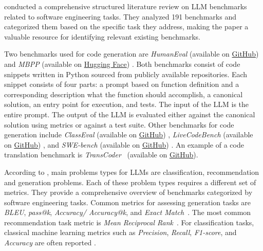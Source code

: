 \citeauthor{hu2025assessingadvancingbenchmarksevaluating} conducted a comprehensive structured literature review on LLM benchmarks related to software engineering tasks.
They analyzed 191 benchmarks and categorized them based on the specific task they address, making the paper a valuable resource for identifying relevant existing benchmarks.

Two benchmarks used for code generation are \emph{HumanEval} (available on \href{https://github.com/openai/human-eval}{GitHub}) \cite{DBLP:conf/acl/PapineniRWZ02} and \emph{MBPP} (available on \href{https://huggingface.co/datasets/google-research-datasets/mbpp}{Hugging Face}) \cite{DBLP:journals/corr/abs-2108-07732}.
Both benchmarks consist of code snippets written in Python sourced from publicly available repositories.
Each snippet consists of four parts: a prompt based on function definition and a corresponding description what the function should accomplish, a canonical solution, an entry point for execution, and tests.
The input of the LLM is the entire prompt.
The output of the LLM is evaluated either against the canonical solution using metrics or against a test suite.
Other benchmarks for code generation include \emph{ClassEval} (available on \href{https://github.com/FudanSELab/ClassEval}{GitHub}) \cite{DBLP:journals/corr/abs-2308-01861}, \emph{LiveCodeBench} (available on \href{https://github.com/LiveCodeBench/LiveCodeBench}{GitHub}) \cite{DBLP:journals/corr/abs-2403-07974}, and \emph{SWE-bench} (available on \href{https://github.com/swe-bench/SWE-bench}{GitHub}) \cite{DBLP:conf/iclr/JimenezYWYPPN24}.
An example of a code translation benchmark is \emph{TransCoder}~\cite{DBLP:journals/corr/abs-2006-03511} (available on \href{https://github.com/facebookresearch/CodeGen}{GitHub}). 

According to \citeauthor{10.1145/3695988}, main problems types for LLMs are classification, recommendation and generation problems.
Each of these problem types requires a different set of metrics.
They provide a comprehensive overview of benchmarks categorized by software engineering tasks.
Common metrics for assessing generation tasks are \emph{BLEU}, \emph{pass@k}, \emph{Accuracy/ Accuracy@k}, and \emph{Exact Match}~\cite{10.1145/3695988}.
The most common recommendation task metric is \emph{Mean Reciprocal Rank}~\cite{10.1145/3695988}.
For classification tasks, classical machine learning metrics such as \emph{Precision}, \emph{Recall}, \emph{F1-score}, and \emph{Accuracy} are often reported \cite{10.1145/3695988}.

